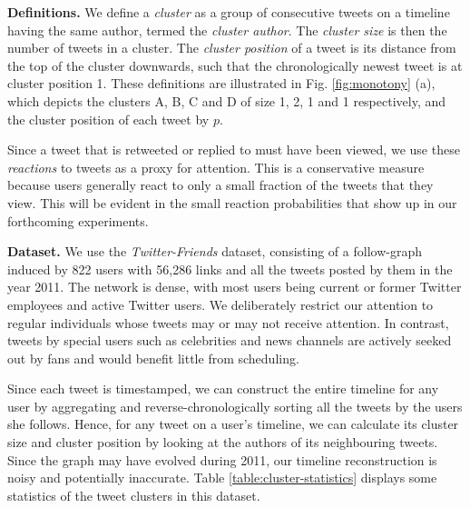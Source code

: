 \documentclass[onesided,asymmetric]{tufte-book}
\begin{document}
\textbf{Definitions.} We define a \textit{cluster} as a group of consecutive tweets on a timeline having the same author, termed the \textit{cluster author}. The \textit{cluster size} is then the number of tweets in a cluster. The \textit{cluster position} of a tweet is its distance from the top of the cluster downwards, such that the chronologically newest tweet is at cluster position 1. These definitions are illustrated in Fig. \ref{fig:monotony} (a), which depicts the clusters A, B, C and D of size 1, 2, 1 and 1 respectively, and the cluster position of each tweet by $p$.

Since a tweet that is retweeted or replied to must have been viewed, we use these \textit{reactions} to tweets as a proxy for attention. This is a conservative measure because users generally react to only a small fraction of the tweets that they view. This will be evident in the small reaction probabilities that show up in our forthcoming experiments.

\textbf{Dataset.} We use the \textit{Twitter-Friends} dataset\cite{lin2014steering}, consisting of a follow-graph induced by 822 users with 56,286 links and all the tweets posted by them in the year 2011. The network is dense, with most users being current or former Twitter employees and active Twitter users. We deliberately restrict our attention to regular individuals whose tweets may or may not receive attention. In contrast, tweets by special users such as celebrities and news channels are actively seeked out by fans and would benefit little from scheduling.

Since each tweet is timestamped, we can construct the entire timeline for any user by aggregating and reverse-chronologically  sorting all the tweets by the users she follows. Hence, for any tweet on a user's timeline, we can calculate its cluster size and cluster position by looking at the authors of its neighbouring tweets. Since the graph may have evolved during 2011, our timeline reconstruction is noisy and potentially inaccurate. Table \ref{table:cluster-statistics} displays some statistics of the tweet clusters in this dataset.
\end{document}
